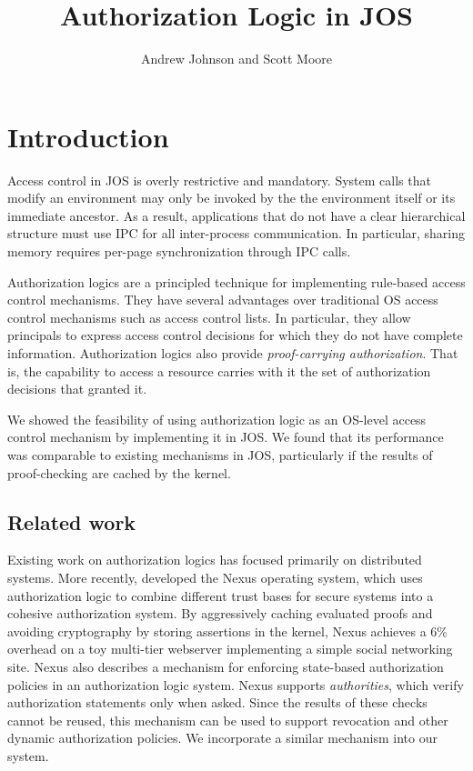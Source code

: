 \documentclass[10pt]{article}
\begin{document}
\title{Authorization Logic in JOS}
\author{Andrew Johnson and Scott Moore}

\maketitle

\thispagestyle{empty}

\setlength\parindent{0em}
\setlength\parskip{1em}

\section{Introduction}
Access control in JOS is overly restrictive and mandatory. System calls that modify an environment may only be invoked by the the environment itself or its immediate ancestor. As a result, applications that do not have a clear hierarchical structure must use IPC for all inter-process communication. In particular, sharing memory requires per-page synchronization through IPC calls.

Authorization logics are a principled technique for implementing rule-based access control mechanisms.
They have several advantages over traditional OS access control mechanisms such as access control lists.
In particular, they allow principals to express access control decisions for which they do not have complete information.
Authorization logics also provide \emph{proof-carrying authorization}. That is, the capability to access a resource carries with it the set of authorization decisions that granted it.

We showed the feasibility of using authorization logic as an OS-level access control mechanism by implementing it in JOS. We found that its performance was comparable to existing mechanisms in JOS, particularly if the results of proof-checking are cached by the kernel.

\subsection{Related work}
Existing work on authorization logics has focused primarily on distributed systems.
More recently, \citet{Nexus} developed the Nexus operating system, which uses authorization logic to combine different trust bases for secure systems into a cohesive authorization system.
By aggressively caching evaluated proofs and avoiding cryptography by storing assertions in the kernel, Nexus achieves a 6\% overhead on a toy multi-tier webserver implementing a simple social networking site.
Nexus also describes a mechanism for enforcing state-based authorization policies in an authorization logic system.
Nexus supports \emph{authorities}, which verify authorization statements only when asked. Since the results of these checks cannot be reused, this mechanism can be used to support revocation and other dynamic authorization policies.
We incorporate a similar mechanism into our system.
\end{document}
